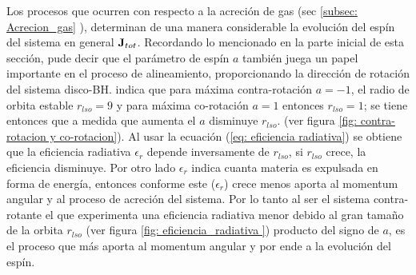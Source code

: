 Los procesos que ocurren con respecto a la acreción de gas (sec \ref{subsec: Acrecion_gas} ), determinan de una manera considerable la evolución del espín del sistema en general ${\bf{J}}_{tot}$. Recordando lo mencionado en la parte inicial de esta sección, pude decir que el parámetro de espín $a$ también juega un papel importante en el proceso de alineamiento, proporcionando la dirección de rotación del sistema disco-BH. \cite{king2005} indica que para máxima contra-rotación $a=-1$, el radio de orbita estable $r_{lso}=9$ y para máxima co-rotación $a=1$ entonces $r_{lso}=1$; se tiene entonces que a medida que aumenta el $a$ disminuye $r_{lso}$. (ver figura \ref{fig: contra-rotacion y co-rotacion}). Al usar la ecuación (\ref{eq: eficiencia radiativa}) se obtiene que la eficiencia radiativa $\epsilon_{r}$ depende inversamente de $r_{lso}$, si $r_{lso}$ crece, la eficiencia disminuye. Por otro lado $\epsilon_{r}$ indica cuanta materia es expulsada en forma de energía, entonces conforme este ($\epsilon_{r}$) crece menos aporta al momentum angular y al proceso de acreción del sistema. Por lo tanto al ser el sistema contra-rotante el que experimenta una eficiencia radiativa menor debido al gran tamaño de la orbita $r_{lso}$ (ver figura \ref{fig: eficiencia_radiativa }) producto del signo de $a$, es el proceso que más aporta al momentum angular y por ende a la evolución del espín. 

